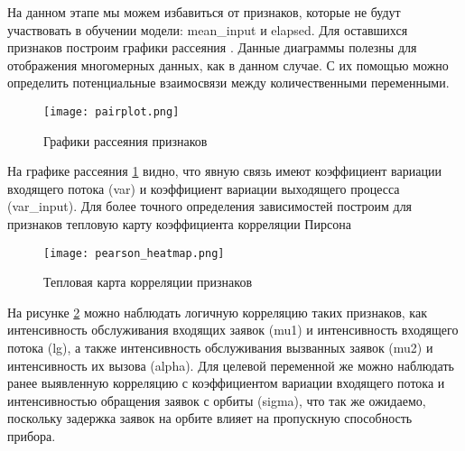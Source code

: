 На данном этапе мы можем избавиться от признаков, которые не будут участвовать в обучении модели: mean\_input и elapsed. Для оставшихся признаков построим графики рассеяния \cite{cox2007pairplot}. Данные диаграммы полезны для отображения многомерных данных, как в данном случае. С их помощью можно определить потенциальные взаимосвязи между количественными переменными.
\begin{figure}[H]
	\centering
	\texttt{[image: pairplot.png]}
	\caption{Графики рассеяния признаков}
	\label{pairplot}
\end{figure}
\clearpage
На графике рассеяния \ref{pairplot} видно, что явную связь имеют коэффициент вариации входящего потока (var) и коэффициент вариации выходящего процесса (var\_input). Для более точного определения зависимостей построим для признаков тепловую карту коэффициента корреляции Пирсона
\begin{figure}[H]
	\centering
	\texttt{[image: pearson\_heatmap.png]}
	\caption{Тепловая карта корреляции признаков}
	\label{pearson_heatmap}
\end{figure}
На рисунке \ref{pearson_heatmap} можно наблюдать логичную корреляцию таких признаков, как интенсивность обслуживания входящих заявок (mu1) и интенсивность входящего потока (lg), а также интенсивность обслуживания вызванных заявок (mu2) и интенсивность их вызова (alpha). Для целевой переменной же можно наблюдать ранее выявленную корреляцию с коэффициентом вариации входящего потока и интенсивностью обращения заявок с орбиты (sigma), что так же ожидаемо, поскольку задержка заявок на орбите влияет на пропускную способность прибора.


